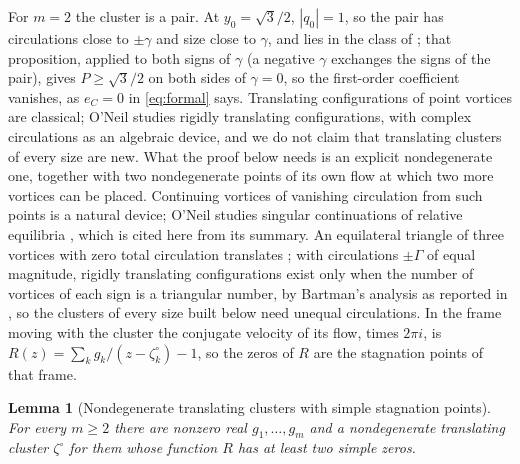 \documentclass[11pt]{article}
\newtheorem{lemma}{Lemma}
\theoremstyle{definition}
\begin{document}
For $m = 2$ the cluster is a pair. At $y_0 = \sqrt{3}/2$, $|q_0| = 1$, so the pair has circulations close to $\pm\gamma$ and size close to $\gamma$, and lies in the class of \cite[Proposition~4]{mw2026}; that proposition, applied to both signs of $\gamma$ (a negative $\gamma$ exchanges the signs of the pair), gives $P \ge \sqrt{3}/2$ on both sides of $\gamma = 0$, so the first-order coefficient vanishes, as $e_C = 0$ in \eqref{eq:formal} says. Translating configurations of point vortices are classical; O'Neil \cite{oneil1987} studies rigidly translating configurations, with complex circulations as an algebraic device, and we do not claim that translating clusters of every size are new. What the proof below needs is an explicit nondegenerate one, together with two nondegenerate points of its own flow at which two more vortices can be placed. Continuing vortices of vanishing circulation from such points is a natural device; O'Neil studies singular continuations of relative equilibria \cite{oneil2013}, which is cited here from its summary. An equilateral triangle of three vortices with zero total circulation translates \cite[Sect.~II]{vc2003}; with circulations $\pm\Gamma$ of equal magnitude, rigidly translating configurations exist only when the number of vortices of each sign is a triangular number, by Bartman's analysis as reported in \cite[Sect.~IX]{vc2003}, so the clusters of every size built below need unequal circulations. In the frame moving with the cluster the conjugate velocity of its flow, times $2\pi i$, is $R(z) = \sum_kg_k/(z - \zeta^\circ_k) - 1$, so the zeros of $R$ are the stagnation points of that frame.

\begin{lemma}[Nondegenerate translating clusters with simple stagnation points]\label{lem:grow}
For every $m \ge 2$ there are nonzero real $g_1, \ldots, g_m$ and a nondegenerate translating cluster $\zeta^\circ$ for them whose function $R$ has at least two simple zeros.
\end{lemma}
\end{document}
